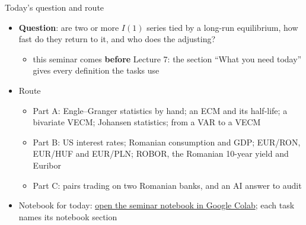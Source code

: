 \begin{frame}{Today's question and route}
\itemsize{\small}
\begin{itemize}
    \item \textbf{Question}: are two or more $I(1)$ series tied by a long-run equilibrium, how fast do they return to it, and who does the adjusting?
    \begin{itemize}
        \item this seminar comes \textbf{before} Lecture 7: the section ``What you need today'' gives every definition the tasks use
    \end{itemize}
    \item Route
    \begin{itemize}
        \item Part A: Engle--Granger statistics by hand; an ECM and its half-life; a bivariate VECM; Johansen statistics; from a VAR to a VECM
        \item Part B: US interest rates; Romanian consumption and GDP; EUR/RON, EUR/HUF and EUR/PLN; ROBOR, the Romanian 10-year yield and Euribor
        \item Part C: pairs trading on two Romanian banks, and an AI answer to audit
    \end{itemize}
    \item Notebook for today: \href{\nb}{open the seminar notebook in Google Colab}; each task names its notebook section
\end{itemize}
\end{frame}

